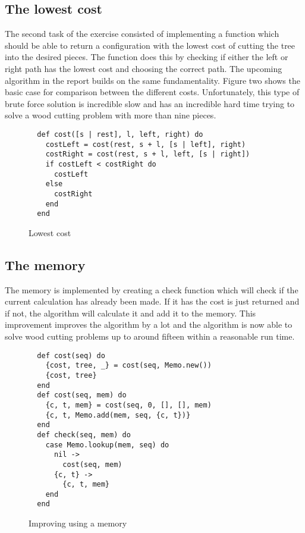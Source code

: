 \documentclass[a4paper,11pt]{article}
\begin{document}
\subsection*{The lowest cost}
The second task of the exercise consisted of implementing a function which should be able to return a configuration with the lowest cost of cutting the tree into the desired pieces. The function does this by checking if either the left or right path has the lowest cost and choosing the correct path. The upcoming algorithm in the report builds on the same fundamentality. Figure two shows the basic case for comparison between the different costs. Unfortunately, this type of brute force solution is incredible slow and has an incredible hard time trying to solve a wood cutting problem with more than nine pieces.

\begin{figure}[H]
\begin{verbatim}
  def cost([s | rest], l, left, right) do
    costLeft = cost(rest, s + l, [s | left], right)
    costRight = cost(rest, s + l, left, [s | right])
    if costLeft < costRight do
      costLeft
    else
      costRight
    end
  end
\end{verbatim}
\caption{Lowest cost}
\label{Figure:2}
\end{figure}

\subsection*{The memory}
The memory is implemented by creating a check function which will check if the current calculation has already been made. If it has the cost is just returned and if not, the algorithm will calculate it and add it to the memory. This improvement improves the algorithm by a lot and the algorithm is now able to solve wood cutting problems up to around fifteen within a reasonable run time.

\begin{figure}[H]
\begin{verbatim}
  def cost(seq) do
    {cost, tree, _} = cost(seq, Memo.new())
    {cost, tree}
  end
  def cost(seq, mem) do
    {c, t, mem} = cost(seq, 0, [], [], mem)
    {c, t, Memo.add(mem, seq, {c, t})}
  end
  def check(seq, mem) do
    case Memo.lookup(mem, seq) do
      nil ->
        cost(seq, mem)
      {c, t} ->
        {c, t, mem}
    end
  end
\end{verbatim}
\caption{Improving using a memory}
\label{Figure:3}
\end{figure}
\end{document}
